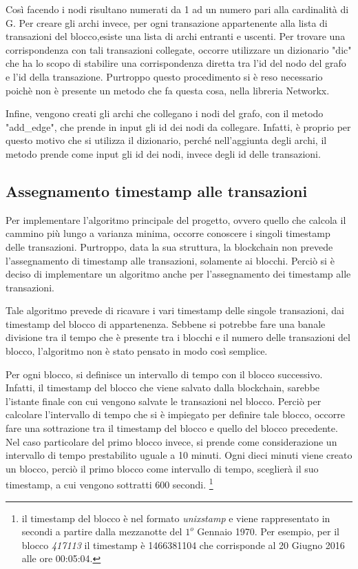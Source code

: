Così facendo i nodi risultano numerati da 1 ad un numero pari alla cardinalità di G. Per creare gli archi invece, per ogni transazione appartenente alla lista di transazioni del blocco,esiste una lista di archi entranti e uscenti. Per trovare una corrispondenza con tali transazioni collegate, occorre utilizzare un dizionario "dic" che ha lo scopo di stabilire una corrispondenza diretta tra l'id del nodo del grafo e l'id della transazione. Purtroppo questo procedimento si è reso necessario poichè non è presente un metodo che fa questa cosa, nella libreria Networkx.

Infine, vengono creati gli archi che collegano i nodi del grafo, con il metodo "add_edge", che prende in input gli id dei nodi da collegare. Infatti, è proprio per questo motivo che si utilizza il dizionario, perché nell'aggiunta degli archi, il metodo prende come input gli id dei nodi, invece degli id delle transazioni.

\subsection{Assegnamento timestamp alle transazioni}
Per implementare l'algoritmo principale del progetto, ovvero quello che calcola il cammino più lungo a varianza minima, occorre conoscere i singoli timestamp delle transazioni. Purtroppo, data la sua struttura, la blockchain non prevede l'assegnamento di timestamp alle transazioni, solamente ai blocchi. Perciò si è deciso di implementare un algoritmo anche per l'assegnamento dei timestamp alle transazioni.

Tale algoritmo prevede di ricavare i vari timestamp delle singole transazioni, dai timestamp del blocco di appartenenza. Sebbene si potrebbe fare una banale divisione tra il tempo che è presente tra i blocchi e il numero delle transazioni del blocco, l'algoritmo non è stato pensato in modo così semplice.

Per ogni blocco, si definisce un intervallo di tempo con il blocco successivo. Infatti, il timestamp del blocco che viene salvato dalla blockchain, sarebbe l'istante finale con cui vengono salvate le transazioni nel blocco. Perciò per calcolare l'intervallo di tempo che si è impiegato per definire tale blocco, occorre fare una sottrazione tra il timestamp del blocco e quello del blocco precedente. Nel caso particolare del primo blocco invece, si prende come considerazione un intervallo di tempo prestabilito uguale a 10 minuti. Ogni dieci minuti viene creato un blocco, perciò il primo blocco come intervallo di tempo, sceglierà il suo timestamp, a cui vengono sottratti 600 secondi. \footnote{il timestamp del blocco è nel formato \textit{unixstamp} e viene rappresentato in secondi a partire dalla mezzanotte del $1^o$ Gennaio 1970. Per esempio, per il blocco \textit{417113} il timestamp è 1466381104 che corrisponde al 20 Giugno 2016 alle ore 00:05:04.}


